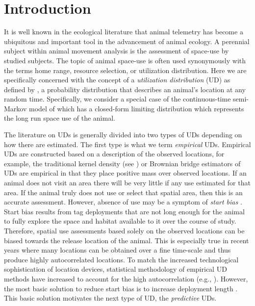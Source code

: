 \documentclass[12pt]{article}
\begin{document}
\renewcommand{\baselinestretch}{1.5}\normalsize
\raggedright
\setlength{\parindent}{2em}
\raggedbottom
\linenumbers


\section{Introduction}

It is well known in the ecological literature that animal telemetry has become a ubiquitous and important tool in the advancement of animal ecology. A perennial subject within animal movement analysis is the assessment of space-use by studied subjects. The topic of animal space-use is often used synonymously with the terms home range, resource selection, or utilization distribution. Here we are specifically concerned with the concept of a {\it utilization distribution} (UD) as defined by \cite{powell2012home}, a probability distribution that describes an animal's location at any random time. Specifically, we consider a special case of the continuous-time semi-Markov model of \cite{Johnson353516} which has a closed-form limiting distribution which represents the long run space use of the animal.

The literature on UDs is generally divided into two types of UDs depending on how there are estimated. The first type is what we term {\it empirical} UDs. Empirical UDs are constructed based on a description of the observed locations, for example, the traditional kernel density (see \citealt{Keating:2009hl}) or Brownian bridge estimators \citep{Horne:2007mw} of UDs are empirical in that they place positive mass over observed locations. If an animal does not visit an area there will be very little if any use estimated for that area. If the animal truly does not use or select that spatial area, then this is an accurate assessment. However, absence of use may be a symptom of {\it start bias} \citep{whitehead2013inferring}. Start bias results from tag deployments that are not long enough for the animal to fully explore the space and habitat available to it over the course of study. Therefore, spatial use assessments based solely on the observed locations can be biased towards the release location of the animal. This is especially true in recent years where many locations can be obtained over a fine time-scale and thus produce highly autocorrelated locations. To match the increased technological sophistication of location devices, statistical methodology of empirical UD methods have increased to account for the high autocorrelation (e.g., \citealt{fleming2015rigorous, calabrese2016ctmm}). However, the most basic solution to reduce start bias is to increase deployment length  \citep{Fieberg:2010fk}. This basic solution motivates the next type of UD, the {\it predictive} UDs.
\end{document}
